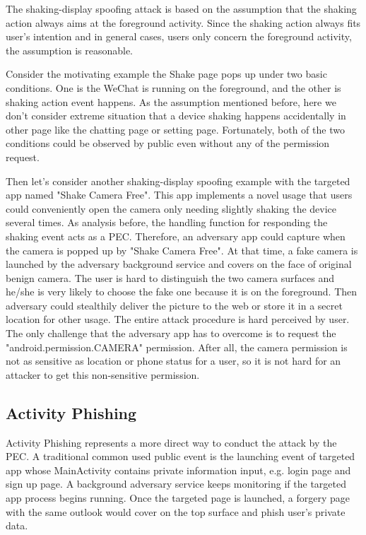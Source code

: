 \documentclass{sig-alternate-05-2015}
\begin{document}
The shaking-display spoofing attack is based on the assumption that the shaking action always aims at the foreground activity. Since the shaking action always fits user's intention and in general cases, users only concern the foreground activity, the assumption is reasonable.

Consider the motivating example the Shake page pops up under two basic conditions. One is the WeChat is running on the foreground, and the other is shaking action event happens. As the assumption mentioned before, here we don't consider extreme situation that a device shaking happens accidentally in other page like the chatting page or setting page. Fortunately, both of the two conditions could be observed by public even without any of the permission request. 

Then let's consider another shaking-display spoofing example with the targeted app named "Shake Camera Free". This app implements a novel usage that users could conveniently open the camera only needing slightly shaking the device several times. As analysis before, the handling function for responding the shaking event acts as a PEC. Therefore, an adversary app could capture when the camera is popped up by "Shake Camera Free". At that time, a fake camera is launched by the adversary background service and covers on the face of original benign camera. The user is hard to distinguish the two camera surfaces and he/she is very likely to choose the fake one because it is on the foreground. Then adversary could stealthily deliver the picture to the web or store it in a secret location for other usage. The entire attack procedure is hard perceived by user. The only challenge that the adversary app has to overcome is to request the  "android.permission.CAMERA" permission. After all, the camera permission is not as sensitive as location or phone status for a user, so it is not hard for an attacker to get this non-sensitive permission.

\subsection{Activity Phishing}
Activity Phishing represents a more direct way to conduct the attack by the PEC. A traditional common used public event is the launching event of targeted app whose MainActivity contains private information input, e.g. login page and sign up page. A background adversary service keeps monitoring if the targeted app process begins running. Once the targeted page is launched, a forgery page with the same outlook would cover on the top surface and phish user's private data.
\end{document}

